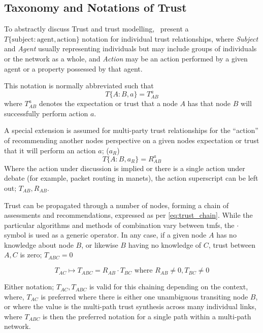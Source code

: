 \pagebreak
\subsection{Taxonomy and Notations of Trust}\label{sec:trust_taxonomy}

To abstractly discuss Trust and trust modelling,~\citet{Liu2006} present a $T\{\text{subject}:\text{agent},\text{action}\}$ notation for individual trust relationships, where \emph{Subject} and \emph{Agent} usually representing individuals but may include groups of individuals or the network as a whole, and \emph{Action} may be an action performed by a given agent or a property possessed by that agent.

This notation is normally abbreviated such that 
\begin{equation}
  \label{eq:trust_notation}
  T\{A:B,a\} = T^a_{AB}
\end{equation} 
where $T^a_{AB}$ denotes the expectation or trust that a node $A$ has that node $B$ will successfully perform action $a$.

A special extension is assumed for multi-party trust relationships for the ``action'' of recommending another nodes perspective on a given nodes expectation or trust that it will perform an action $a$; ($a_R$)
%
\begin{equation}
  \label{eq:recommendation_notation}
  T\{A:B,a_R\} = R^a_{AB}
\end{equation}
%
Where the action under discussion is implied or there is a single action under debate (for example, packet routing in \glspl{manet}), the action superscript can be left out; $T_{AB} , R_{AB}$.

Trust can be propagated through a number of nodes, forming a chain of assessments and recommendations, expressed as per \eqref{eq:trust_chain}.
While the particular algorithms and methods of combination vary between \glspl{tmf}, the $\cdot$ symbol is used as a generic operator.
In any case, if a given node $A$ has no knowledge about node $B$, or likewise $B$ having no knowledge of $C$, trust between $A,C$ is zero; $T_{ABC} = 0$

\begin{equation}
	\label{eq:trust_chain}
	T_ {AC}\mapsto T_{ABC} = R_{AB} \cdot T_{BC} \text{ where } R_{AB} \neq 0 , T_{BC} \neq 0
\end{equation}

Either notation; $T_{AC}, T_{ABC}$ is valid for this chaining depending on the context, where, $T_{AC}$ is preferred where there is either one unambiguous transiting node $B$, or where the value is the multi-path trust synthesis across many individual links, where $T_{ABC}$ is then the preferred notation for a single path within a multi-path network.

